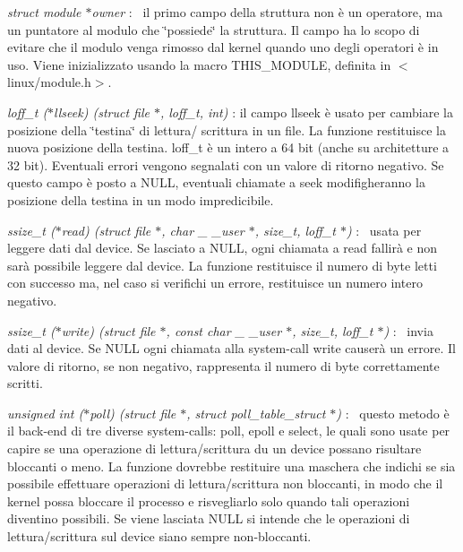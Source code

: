 \begin{DoxyItemize}
\item {\itshape struct module $\ast$owner} \+:~\newline
 il primo campo della struttura non è un operatore, ma un puntatore al modulo che \char`\"{}possiede\char`\"{} la struttura. Il campo ha lo scopo di evitare che il modulo venga rimosso dal kernel quando uno degli operatori è in uso. Viene inizializzato usando la macro T\+H\+I\+S\+\_\+\+M\+O\+D\+U\+L\+E, definita in $<$linux/module.\+h$>$.
\item {\itshape loff\+\_\+t ($\ast$llseek) (struct file $\ast$, loff\+\_\+t, int)} \+: il campo llseek è usato per cambiare la posizione della \char`\"{}testina\char`\"{} di lettura/ scrittura in un file. La funzione restituisce la nuova posizione della testina. loff\+\_\+t è un intero a 64 bit (anche su architetture a 32 bit). Eventuali errori vengono segnalati con un valore di ritorno negativo. Se questo campo è posto a N\+U\+L\+L, eventuali chiamate a seek modifigheranno la posizione della testina in un modo impredicibile.
\item {\itshape ssize\+\_\+t ($\ast$read) (struct file $\ast$, char \+\_\+ \+\_\+user $\ast$, size\+\_\+t, loff\+\_\+t $\ast$)} \+:~\newline
 usata per leggere dati dal device. Se lasciato a N\+U\+L\+L, ogni chiamata a read fallirà e non sarà possibile leggere dal device. La funzione restituisce il numero di byte letti con successo ma, nel caso si verifichi un errore, restituisce un numero intero negativo.
\item {\itshape ssize\+\_\+t ($\ast$write) (struct file $\ast$, const char \+\_\+ \+\_\+user $\ast$, size\+\_\+t, loff\+\_\+t $\ast$)} \+:~\newline
 invia dati al device. Se N\+U\+L\+L ogni chiamata alla system-\/call write causerà un errore. Il valore di ritorno, se non negativo, rappresenta il numero di byte correttamente scritti.
\item {\itshape unsigned int ($\ast$poll) (struct file $\ast$, struct poll\+\_\+table\+\_\+struct $\ast$)} \+:~\newline
 questo metodo è il back-\/end di tre diverse system-\/calls\+: poll, epoll e select, le quali sono usate per capire se una operazione di lettura/scrittura du un device possano risultare bloccanti o meno. La funzione dovrebbe restituire una maschera che indichi se sia possibile effettuare operazioni di lettura/scrittura non bloccanti, in modo che il kernel possa bloccare il processo e risvegliarlo solo quando tali operazioni diventino possibili. Se viene lasciata N\+U\+L\+L si intende che le operazioni di lettura/scrittura sul device siano sempre non-\/bloccanti.

\end{DoxyItemize}
